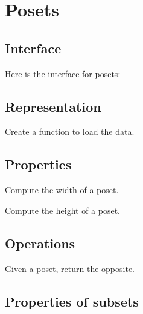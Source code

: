 \section{Posets}

\subsection*{Interface}

Here is the interface for posets:

%

\subsection*{Representation}


\begin{exercise}[Representation]
  Create a function to load the data.


%

\end{exercise}

\subsection{Properties}


\begin{exercise}
  Compute the width of a poset.
\end{exercise}

\begin{exercise}
  Compute the height of a poset.
\end{exercise}

\subsection{Operations}


\begin{exercise}
  Given a poset, return the opposite.
\end{exercise}

\subsection{Properties of subsets}



